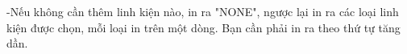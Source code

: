 -Nếu không cần thêm linh kiện nào, in ra "NONE", ngược lại in ra các loại linh kiện được chọn, mỗi loại in trên một dòng. Bạn cần phải in ra theo thứ tự tăng dần.